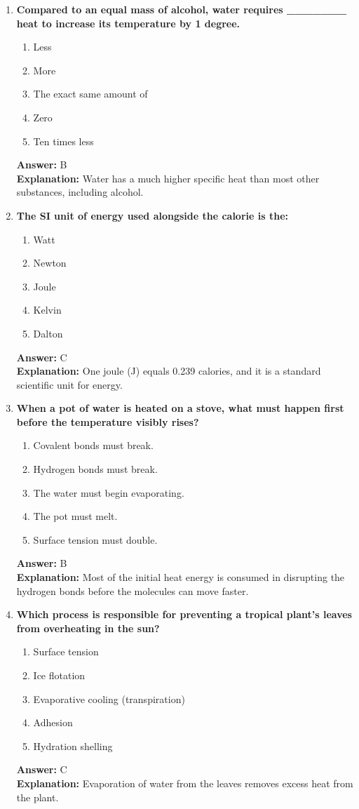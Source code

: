 \documentclass[11pt, a4paper]{article}
\begin{document}
\begin{enumerate}
\item \textbf{Compared to an equal mass of alcohol, water requires \_\_\_\_\_\_\_ heat to increase its temperature by 1 degree.}
\begin{enumerate}[label=\Alph*.]
    \item Less
    \item More
    \item The exact same amount of
    \item Zero
    \item Ten times less
\end{enumerate}
\textbf{Answer:} B \\
\textbf{Explanation:} Water has a much higher specific heat than most other substances, including alcohol.

\item \textbf{The SI unit of energy used alongside the calorie is the:}
\begin{enumerate}[label=\Alph*.]
    \item Watt
    \item Newton
    \item Joule
    \item Kelvin
    \item Dalton
\end{enumerate}
\textbf{Answer:} C \\
\textbf{Explanation:} One joule (J) equals 0.239 calories, and it is a standard scientific unit for energy.

\item \textbf{When a pot of water is heated on a stove, what must happen first before the temperature visibly rises?}
\begin{enumerate}[label=\Alph*.]
    \item Covalent bonds must break.
    \item Hydrogen bonds must break.
    \item The water must begin evaporating.
    \item The pot must melt.
    \item Surface tension must double.
\end{enumerate}
\textbf{Answer:} B \\
\textbf{Explanation:} Most of the initial heat energy is consumed in disrupting the hydrogen bonds before the molecules can move faster.

\item \textbf{Which process is responsible for preventing a tropical plant's leaves from overheating in the sun?}
\begin{enumerate}[label=\Alph*.]
    \item Surface tension
    \item Ice flotation
    \item Evaporative cooling (transpiration)
    \item Adhesion
    \item Hydration shelling
\end{enumerate}
\textbf{Answer:} C \\
\textbf{Explanation:} Evaporation of water from the leaves removes excess heat from the plant.


\end{enumerate}
\end{document}
